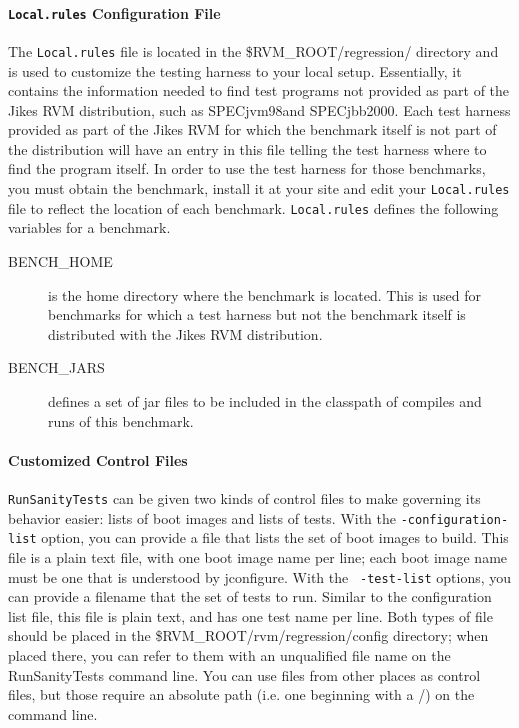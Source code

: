 \paragraph{{\tt{Local.rules}} Configuration File}

 The {\tt Local.rules} file is located in the \$RVM\_ROOT/regression/
directory and is used to customize the testing harness to your local
setup.  Essentially, it contains the information needed to find test
programs not provided as part of the Jikes RVM distribution, such as
SPECjvm98\trademark and SPECjbb2000\trademark.  Each test harness
provided as part of the Jikes RVM for which the benchmark itself is
not part of the distribution will have an entry in this file telling
the test harness where to find the program itself.  In order to use
the test harness for those benchmarks, you must obtain the benchmark,
install it at your site and edit your {\tt{Local.rules}} file to
reflect the location of each benchmark.  {\tt{Local.rules}} defines
the following variables for a benchmark.
\begin{description}
\item[BENCH\_HOME] is the home directory where the benchmark is
located.  This is used for benchmarks for which a test harness but not
the benchmark itself is distributed with the Jikes RVM distribution. 
\item[BENCH\_JARS] defines a set of jar files to be included in the
classpath of compiles and runs of this benchmark.
\end{description}

\paragraph{Customized Control Files}

 {\tt{RunSanityTests}} can be given two kinds of control files to make
governing its behavior easier: lists of boot images and lists of
tests.  With the {\tt -configuration-list} option, you can provide a
file that lists the set of boot images to build.  This file is a plain
text file, with one boot image name per line; each boot image name
must be one that is understood by jconfigure.  With the {\tt
-test-list} options, you can provide a filename that the set of tests
to run.  Similar to the configuration list file, this file is plain
text, and has one test name per line.  Both types of file should be
placed in the \$RVM\_ROOT/rvm/regression/config directory; when placed
there, you can refer to them with an unqualified file name on the
RunSanityTests command line.  You can use files from other places as
control files, but those require an absolute path (i.e. one beginning
with a /) on the command line.


